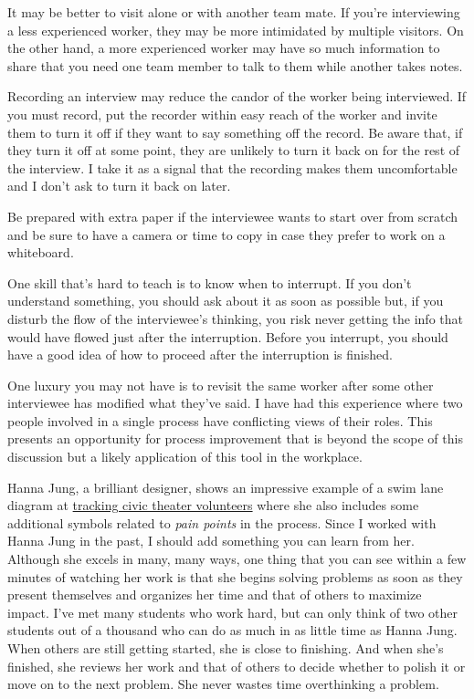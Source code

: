 It may be better to visit alone or with another team mate. If you're
interviewing a less experienced worker, they may be more intimidated by
multiple visitors. On the other hand, a more experienced worker may have
so much information to share that you need one team member to talk to
them while another takes notes.

Recording an interview may reduce the candor of the worker being
interviewed. If you must record, put the recorder within easy reach of
the worker and invite them to turn it off if they want to say something
off the record. Be aware that, if they turn it off at some point, they
are unlikely to turn it back on for the rest of the interview. I take it
as a signal that the recording makes them uncomfortable and I don't ask
to turn it back on later.

Be prepared with extra paper if the interviewee wants to start over from
scratch and be sure to have a camera or time to copy in case they prefer
to work on a whiteboard.

One skill that's hard to teach is to know when to interrupt. If you
don't understand something, you should ask about it as soon as possible
but, if you disturb the flow of the interviewee's thinking, you risk
never getting the info that would have flowed just after the
interruption. Before you interrupt, you should have a good idea of how
to proceed after the interruption is finished.

One luxury you may not have is to revisit the same worker after some
other interviewee has modified what they've said. I have had this
experience where two people involved in a single process have
conflicting views of their roles. This presents an opportunity for
process improvement that is beyond the scope of this discussion but a
likely application of this tool in the workplace.

\hypertarget{an-exemplary-swim-lane-diagram}{%
\label{an-exemplary-swim-lane-diagram}}

Hanna Jung, a brilliant designer, shows an impressive example of a swim
lane diagram at \href{http://www.hannajun.com/aa1.jpg}{tracking civic
theater volunteers} where she also includes some additional symbols
related to \emph{pain points} in the process. Since I worked with Hanna
Jung in the past, I should add something you can learn from her.
Although she excels in many, many ways, one thing that you can see
within a few minutes of watching her work is that she begins solving
problems as soon as they present themselves and organizes her time and
that of others to maximize impact. I've met many students who work hard,
but can only think of two other students out of a thousand who can do as
much in as little time as Hanna Jung. When others are still getting
started, she is close to finishing. And when she's finished, she reviews
her work and that of others to decide whether to polish it or move on to
the next problem. She never wastes time overthinking a problem.

